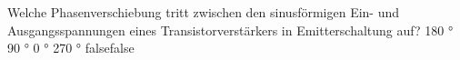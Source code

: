     {Welche Phasenverschiebung tritt zwischen den sinusförmigen Ein- und Ausgangsspannungen eines Transistorverstärkers in Emitterschaltung auf?}
    {180 °}
    {90 °}
    {0 °}
    {270 °}
    {false}{false}